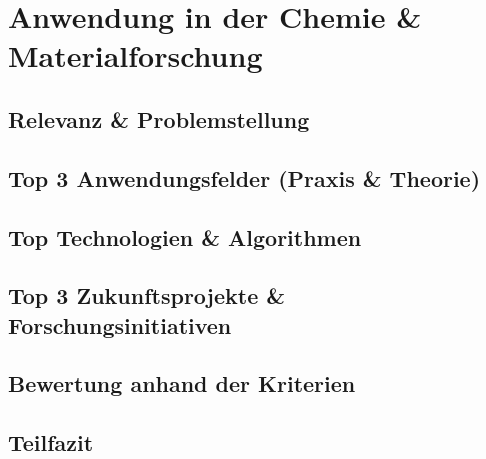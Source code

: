 \chapter{Anwendung in der Chemie \& Materialforschung}
\label{trends} %



\section{Relevanz \& Problemstellung}
\section{Top 3 Anwendungsfelder (Praxis \& Theorie)}
\section{Top Technologien \& Algorithmen}
\section{Top 3 Zukunftsprojekte \& Forschungsinitiativen}
\section{Bewertung anhand der Kriterien}
\section{Teilfazit}


\printbibliography
